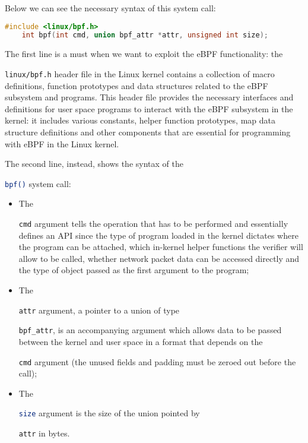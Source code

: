 Below we can see the necessary syntax of this system call:

\begin{lstlisting}[style=cstyle, language=C, caption={\colorbox{backcolour}{\lstinline[style=commandline, language=bash]|bpf()|} system call signature.}]
	#include <linux/bpf.h>
	int bpf(int cmd, union bpf_attr *attr, unsigned int size);
\end{lstlisting}

The first line is a must when we want to exploit the eBPF functionality: the \raggedright\colorbox{backcolour}{\lstinline[style=commandline, language=bash]|linux/bpf.h|} header file in the Linux kernel contains a collection of macro definitions, function prototypes and data structures related to the eBPF subsystem and programs. 
This header file provides the necessary interfaces and definitions for user space programs to interact with the eBPF subsystem in the kernel: it includes various constants, helper function prototypes, map data structure definitions and other components that are essential for programming with eBPF in the Linux kernel.

The second line, instead, shows the syntax of the \raggedright\colorbox{backcolour}{\lstinline[style=commandline, language=bash]|bpf()|} system call:

\begin{itemize}
	\item 
		The \raggedright\colorbox{backcolour}{\lstinline[style=commandline, language=bash]|cmd|} argument tells the operation that has to be performed and essentially defines an API since the type of program loaded in the kernel dictates where the program can be attached, which in-kernel helper functions the verifier will allow to be called, whether network packet data can be accessed directly and the type of object passed as the first argument to the program;
	\item 
		The \raggedright\colorbox{backcolour}{\lstinline[style=commandline, language=bash]|attr|} argument, a pointer to a union of type \raggedright\colorbox{backcolour}{\lstinline[style=commandline, language=bash]|bpf_attr|}, is an accompanying argument which allows data to be passed between the kernel and user space in a format that depends on the \raggedright\colorbox{backcolour}{\lstinline[style=commandline, language=bash]|cmd|} argument (the unused fields and padding must be zeroed out before the call);
	\item 
		The \raggedright\colorbox{backcolour}{\lstinline[style=commandline, language=bash]|size|} argument is the size of the union pointed by \raggedright\colorbox{backcolour}{\lstinline[style=commandline, language=bash]|attr|} in bytes.
\end{itemize}

